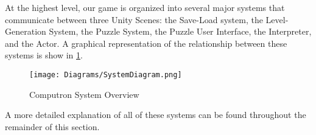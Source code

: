 At the highest level, our game is organized into several major systems that communicate between three Unity Scenes: the Save-Load system, the Level-Generation System, the Puzzle System, the Puzzle User Interface, the Interpreter, and the Actor. A graphical representation of the relationship between these systems is show in \ref{fig:overall_system_diagram}.

\begin{figure}[!hb]
    \caption{Computron System Overview}
    \label{fig:overall_system_diagram}
    \centering
    \texttt{[image: Diagrams/SystemDiagram.png]}
\end{figure}

A more detailed explanation of all of these systems can be found throughout the remainder of this section.